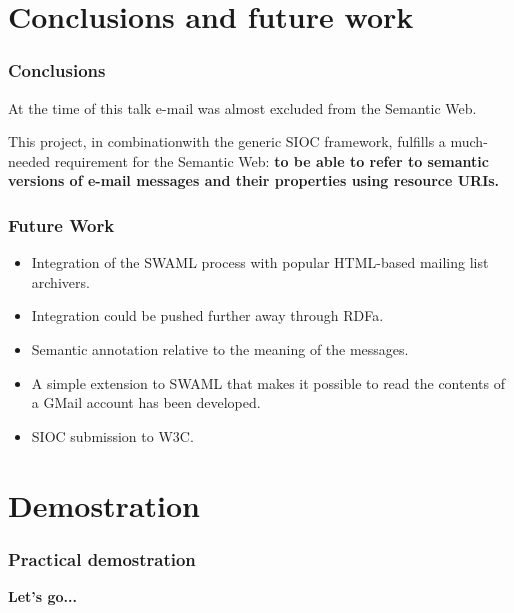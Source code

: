 \documentclass[spanish,notes=hide,16pt]{beamer}
\begin{document}
\section{Conclusions and future work}
\frame
{
  \frametitle{Conclusions}

  \begin{Large}
    At the time of this talk e-mail was almost excluded from the Semantic Web.

    \vspace{1cm}

    This project, in combinationwith the generic SIOC framework, fulfills a 
    much-needed requirement for the Semantic Web: \textbf{to be able to refer 
    to semantic versions of e-mail messages and their properties using resource 
    URIs.}
    
  \end{Large}
}
\frame
{
  \frametitle{Future Work}

  \begin{itemize}
   \item \begin{Large}Integration of the SWAML process with popular HTML-based mailing list archivers.\end{Large}
   \item \begin{Large}Integration could be pushed further away through RDFa.\end{Large}
   \item \begin{Large}Semantic annotation relative to the meaning of the messages.\end{Large}
   \item \begin{Large}A simple extension to SWAML that makes it possible to read the contents of a GMail account has 
		been developed.\end{Large}
   \item \begin{Large}SIOC submission to W3C.\end{Large}
  \end{itemize}
}

\section{Demostration}
\frame
{
  \frametitle{Practical demostration}

  \begin{center}
    \LARGE{\textbf{Let's go...}}
  \end{center}
}
\end{document}
